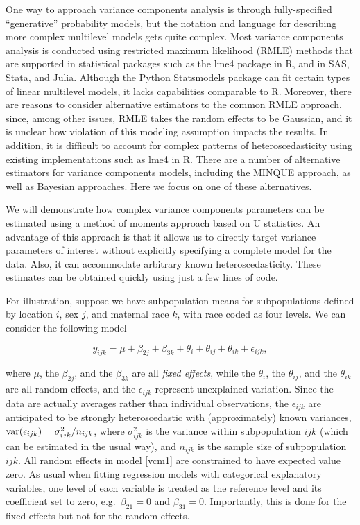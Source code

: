 One way to approach variance components analysis is through fully-specified ``generative'' probability models, but the notation and language for describing more complex multilevel models gets quite complex. Most variance components analysis is conducted using restricted maximum likelihood (RMLE) methods that are supported in statistical packages such as the lme4 package in R, and in SAS, Stata, and Julia. Although the Python Statsmodels package can fit certain types of linear multilevel models, it lacks capabilities comparable to R. Moreover, there are reasons to consider alternative estimators to the common RMLE approach, since, among other issues, RMLE takes the random effects to be Gaussian, and it is unclear how violation of this modeling assumption impacts the results. In addition, it is difficult to account for complex patterns of heteroscedasticity using existing implementations such as lme4 in R. There are a number of alternative estimators for variance components models, including the MINQUE approach, as well as Bayesian approaches. Here we focus on one of these alternatives.

We will demonstrate how complex variance components parameters can be estimated using a method of moments approach based on U statistics. An advantage of this approach is that it allows us to directly target variance parameters of interest without explicitly specifying a complete model for the data. Also, it can accommodate arbitrary known heteroscedasticity. These estimates can be obtained quickly using just a few lines of code.

For illustration, suppose we have subpopulation means for subpopulations defined by location $i$, sex $j$, and maternal race $k$, with race coded as four levels. We can consider the following model

\begin{equation}
y_{ijk} = \mu + \beta_{2j} + \beta_{3k} + \theta_i + \theta_{ij} + \theta_{ik} + \epsilon_{ijk}, \label{vcm1}
\end{equation}

\noindent where $\mu$, the $\beta_{2j}$, and the $\beta_{3k}$ are all \textit{fixed effects}, while the $\theta_i$, the $\theta_{ij}$, and the $\theta_{ik}$ are all random effects, and the $\epsilon_{ijk}$ represent unexplained variation. Since the data are actually averages rather than individual observations, the $\epsilon_{ijk}$ are anticipated to be strongly heteroscedastic with (approximately) known variances, ${\rm var}(\epsilon_{ijk}) = \sigma_{ijk}^2 / n_{ijk}$, where $\sigma_{ijk}^2$ is the variance within subpopulation $ijk$ (which can be estimated in the usual way), and $n_{ijk}$ is the sample size of subpopulation $ijk$. All random effects in model \ref{vcm1} are constrained to have expected value zero. As usual when fitting regression models with categorical explanatory variables, one level of each variable is treated as the reference level and its coefficient set to zero, e.g.\ $\beta_{21} = 0$ and $\beta_{31} = 0$. Importantly, this is done for the fixed effects but not for the random effects.

